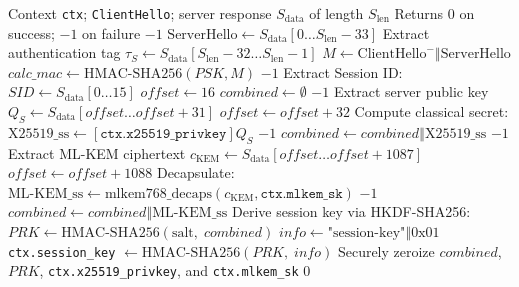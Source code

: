 \documentclass[journal, 10pt]{IEEEtran}
\begin{document}
\begin{algorithm}[!t]
\caption{Server Response Processing and Key Agreement}
\begin{algorithmic}[1]
\REQUIRE Context \texttt{ctx}; \texttt{ClientHello}; server response $S_{\text{data}}$ of length $S_{\text{len}}$
\ENSURE Returns $0$ on success; $-1$ on failure
    \RETURN $-1$
\ENDIF
\STATE $\text{ServerHello} \leftarrow S_{\text{data}}[0 \dots S_{\text{len}} - 33]$
\STATE Extract authentication tag $\tau_S \leftarrow S_{\text{data}}[S_{\text{len}} - 32 \dots S_{\text{len}} - 1]$
\STATE $M \leftarrow \text{ClientHello}^{-} \mathbin{\Vert} \text{ServerHello}$
\STATE $\mathit{calc\_mac} \leftarrow \text{HMAC-SHA256}(PSK,M)$
    \RETURN $-1$ 
\ENDIF
\STATE Extract Session ID: $\mathit{SID} \leftarrow S_{\text{data}}[0 \dots 15]$
\STATE $\mathit{offset} \leftarrow 16$
\STATE $\mathit{combined} \leftarrow \emptyset$
        \RETURN $-1$
    \ENDIF
    \STATE Extract server public key $Q_S \leftarrow S_{\text{data}}[\mathit{offset} \dots \mathit{offset}+31]$
    \STATE $\mathit{offset} \leftarrow \mathit{offset} + 32$
    \STATE Compute classical secret: $\text{X25519\_ss} \leftarrow [\texttt{ctx.x25519\_privkey}] Q_S$
        \RETURN $-1$
    \ENDIF
    \STATE $\mathit{combined} \leftarrow \mathit{combined} \mathbin{\Vert} \text{X25519\_ss}$
\ENDIF
{}
        \RETURN $-1$
    \ENDIF
    \STATE Extract ML-KEM ciphertext $c_{\text{KEM}} \leftarrow S_{\text{data}}[\mathit{offset} \dots \mathit{offset} + 1087]$
    \STATE $\mathit{offset} \leftarrow \mathit{offset} + 1088$
    \STATE Decapsulate: $\text{ML-KEM\_ss} \leftarrow \text{mlkem768\_decaps}(c_{\text{KEM}}, \texttt{ctx.mlkem\_sk})$
        \RETURN $-1$
    \ENDIF
    \STATE $\mathit{combined} \leftarrow \mathit{combined} \mathbin{\Vert} \text{ML-KEM\_ss}$
\ENDIF
\STATE Derive session key via HKDF-SHA256:
\STATE $\mathit{PRK} \leftarrow \text{HMAC-SHA256}(\text{salt},\; \mathit{combined})$ 
\STATE $\mathit{info} \leftarrow \text{"session-key"} \mathbin{\Vert} \text{0x01}$
\STATE \texttt{ctx.session\_key} $\leftarrow \text{HMAC-SHA256}(\mathit{PRK},\; \mathit{info})$ 
\STATE Securely zeroize $\mathit{combined}$, $\mathit{PRK}$, \texttt{ctx.x25519\_privkey}, and \texttt{ctx.mlkem\_sk}
\RETURN $0$
\end{algorithmic}
\end{algorithm}
\end{document}
